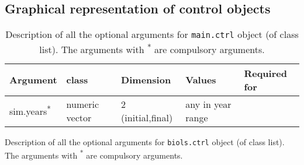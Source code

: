 
\begin{landscape}

\section{Graphical representation of control objects} \label{sec:CtrlObj_tab}

\setcounter{figure}{0} 
\setcounter{table}{0}

\begin{table}[!ht]

  \centering
  \begin{footnotesize}
    
    \caption{Description of all the optional arguments for \texttt{main.ctrl} object (of class list).
    The arguments with \textsuperscript{*} are compulsory arguments.}
    
    \label{tb:A3.table1}
    
    \begin{threeparttable}
    
      \begin{tabular}{lllll} %
        \hline 
        Argument & class & Dimension & Values & Required for \\
        \hline
        sim.years\textsuperscript{*} & numeric vector & 2 (initial,final) & any in year range &  \\
        \hline
      \end{tabular}
      
    \end{threeparttable}
  \end{footnotesize}

\end{table}


\begin{table}[!ht]

  \centering
  \begin{footnotesize}
    
    \caption{Description of all the optional arguments for \texttt{biols.ctrl} object (of class list).
    The arguments with \textsuperscript{*} are compulsory arguments.}
    
    \label{tb:A3.table2}
    
    \begin{threeparttable}
    

\end{threeparttable}
\end{footnotesize}
\end{table}
\end{landscape}
